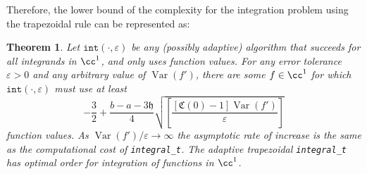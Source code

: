 \documentclass{iitthesis}
\DeclareMathOperator{\Var}{Var}
\newtheorem{theorem}{Theorem}
\theoremstyle{definition}
\theoremstyle{remark}
\begin{document}
Therefore, the lower bound of the complexity for the integration problem using the trapezoidal rule can be represented as:
\begin{theorem} \label{comptrap}
Let $\texttt{int}(\cdot,\varepsilon)$ be any (possibly adaptive) algorithm that succeeds for all integrands in $\cc^1$, and only uses function values. For any error tolerance $\varepsilon > 0$ and any arbitrary value of $\Var(f')$, there are some $f\in \cc^1$ for which $\texttt{int}(\cdot,\varepsilon)$ must use at least
    \begin{equation}\label{complowbdtrap}
        -\frac{3}{2}+\frac{b-a-3\mathfrak{h}}{4}\sqrt{\left[\frac{[\mathfrak{C}(0)-1]\Var( f')}{\varepsilon}\right]}
    \end{equation}
    function values. As $\Var(f')/\varepsilon \rightarrow \infty$ the asymptotic rate of increase is the same as the computational cost of {\tt integral\_t}. The adaptive trapezoidal {\tt integral\_t} has optimal order for integration of functions in $\cc^1$.
\end{theorem}
\end{document}
